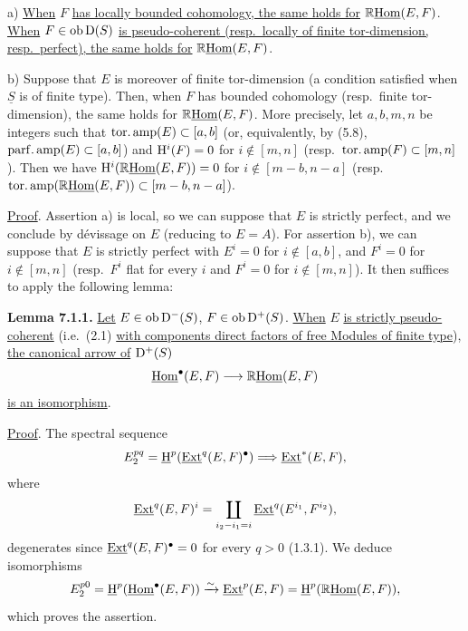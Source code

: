 a) \uline{When} \(F\) \uline{has locally bounded cohomology, the same holds for} \(\mathbb{R}\underline{\operatorname{Hom}}(E,F)\). \uline{When} \(F\in\operatorname{ob}\mathrm D(S)\) \uline{is pseudo-coherent (resp.\ locally of finite tor-dimension, resp.\ perfect), the same holds for} \(\mathbb{R}\underline{\operatorname{Hom}}(E,F)\).

%
b) Suppose that \(E\) is moreover of finite tor-dimension (a condition satisfied when \(\underline{S}\) is of finite type). Then, when \(F\) has bounded cohomology (resp.\ finite tor-dimension), the same holds for \(\mathbb{R}\underline{\operatorname{Hom}}(E,F)\). More precisely, let \(a,b,m,n\) be integers such that \(\operatorname{tor.amp}(E)\subset[a,b]\) (or, equivalently, by (5.8), \(\operatorname{parf.amp}(E)\subset[a,b]\)) and \(\mathrm H^i(F)=0\) for \(i\notin[m,n]\) (resp.\ \(\operatorname{tor.amp}(F)\subset[m,n]\)). Then we have \(\mathrm H^i(\mathbb{R}\underline{\operatorname{Hom}}(E,F))=0\) for \(i\notin[m-b,n-a]\) (resp.\ \(\operatorname{tor.amp}(\mathbb{R}\underline{\operatorname{Hom}}(E,F))\subset[m-b,n-a]\)).

\uline{Proof}. Assertion a) is local, so we can suppose that \(E\) is strictly perfect, and we conclude by dévissage on \(E\) (reducing to \(E=A\)). For assertion b), we can suppose that \(E\) is strictly perfect with \(E^i=0\) for \(i\notin[a,b]\), and \(F^i=0\) for \(i\notin[m,n]\) (resp.\ \(F^i\) flat for every \(i\) and \(F^i=0\) for \(i\notin[m,n]\)). It then suffices to apply the following lemma:

\textbf{Lemma 7.1.1.} \uline{Let} \(E\in\operatorname{ob}\mathrm D^-(S)\), \(F\in\operatorname{ob}\mathrm D^+(S)\). \uline{When} \(E\) \uline{is strictly pseudo-coherent} (i.e.\ (2.1) \uline{with components direct factors of free Modules of finite type}), \uline{the canonical arrow of} \(\mathrm D^+(S)\)
\[
  \underline{\operatorname{Hom}}^\bullet(E,F)\longrightarrow\mathbb{R}\underline{\operatorname{Hom}}(E,F)
\]
\uline{is an isomorphism}.

\uline{Proof}. The spectral sequence
\[
  E_2^{pq}=\underline{\mathrm H}^p(\underline{\operatorname{Ext}}^q(E,F)^\bullet)\Longrightarrow \underline{\operatorname{Ext}}^*(E,F),
\]
where
\[
  \underline{\operatorname{Ext}}^q(E,F)^i=\coprod_{i_2-i_1=i}\underline{\operatorname{Ext}}^q(E^{i_1},F^{i_2}),
\]
degenerates since \(\underline{\operatorname{Ext}}^q(E,F)^\bullet=0\) for every \(q>0\) (1.3.1). We deduce isomorphisms
%
\[
  E_2^{p0}=\underline{\mathrm H}^p(\underline{\operatorname{Hom}}^\bullet(E,F))
  \xrightarrow{\sim}\underline{\operatorname{Ext}}^p(E,F)=\underline{\mathrm H}^p(\mathbb{R}\underline{\operatorname{Hom}}(E,F)),
\]
which proves the assertion.

